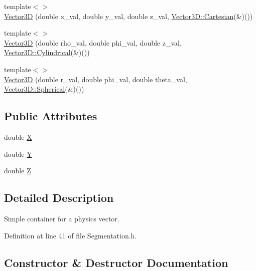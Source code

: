 \begin{DoxyCompactItemize}
{\footnotesize template$<$$>$ }\\\hyperlink{struct_d_d4hep_1_1_d_d_segmentation_1_1_vector3_d_af201d57d6352451f57d9cba70fda0dfd}{Vector3D} (double x\+\_\+val, double y\+\_\+val, double z\+\_\+val, \hyperlink{struct_d_d_surfaces_1_1_vector3_d_1_1_cartesian}{Vector3\+D\+::\+Cartesian}(\&)())
\item 
{\footnotesize template$<$$>$ }\\\hyperlink{struct_d_d4hep_1_1_d_d_segmentation_1_1_vector3_d_aa862100b1cfe813fd84a6b8fc0a8cf29}{Vector3D} (double rho\+\_\+val, double phi\+\_\+val, double z\+\_\+val, \hyperlink{struct_d_d_surfaces_1_1_vector3_d_1_1_cylindrical}{Vector3\+D\+::\+Cylindrical}(\&)())
\item 
{\footnotesize template$<$$>$ }\\\hyperlink{struct_d_d4hep_1_1_d_d_segmentation_1_1_vector3_d_ad625c504d14d11d0b65edaca042cb6c9}{Vector3D} (double r\+\_\+val, double phi\+\_\+val, double theta\+\_\+val, \hyperlink{struct_d_d_surfaces_1_1_vector3_d_1_1_spherical}{Vector3\+D\+::\+Spherical}(\&)())
\end{DoxyCompactItemize}
\subsection*{Public Attributes}
\begin{DoxyCompactItemize}
\item 
double \hyperlink{struct_d_d4hep_1_1_d_d_segmentation_1_1_vector3_d_ac48f4f10c3545a48be92b2f970177868}{X}
\item 
double \hyperlink{struct_d_d4hep_1_1_d_d_segmentation_1_1_vector3_d_a9cde1750ebf8b923704e6118f00d1ed6}{Y}
\item 
double \hyperlink{struct_d_d4hep_1_1_d_d_segmentation_1_1_vector3_d_a80100f70c9d120e5a5f6abd1fcbac26f}{Z}
\end{DoxyCompactItemize}


\subsection{Detailed Description}
Simple container for a physics vector. 

Definition at line 41 of file Segmentation.\+h.



\subsection{Constructor \& Destructor Documentation}
\hypertarget{struct_d_d4hep_1_1_d_d_segmentation_1_1_vector3_d_a2b4422ed26bde66eeaac8bc46db07280}{}\label{struct_d_d4hep_1_1_d_d_segmentation_1_1_vector3_d_a2b4422ed26bde66eeaac8bc46db07280} 

